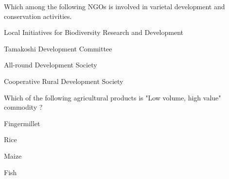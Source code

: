 \begin{questions}
\question Which among the following NGOs is involved in varietal development and conservation activities.
\begin{items}
\item* Local Initiatives for Biodiversity Research and Development
\item Tamakoshi Development Committee
\item All-round Development Society
\item Cooperative Rural Development Society
\end{items}

\question Which of the following agricultural products is "Low volume, high value" commodity ?
\begin{items}
\item Fingermillet
\item Rice
\item Maize
\item* Fish
\end{items}

\end{questions}
